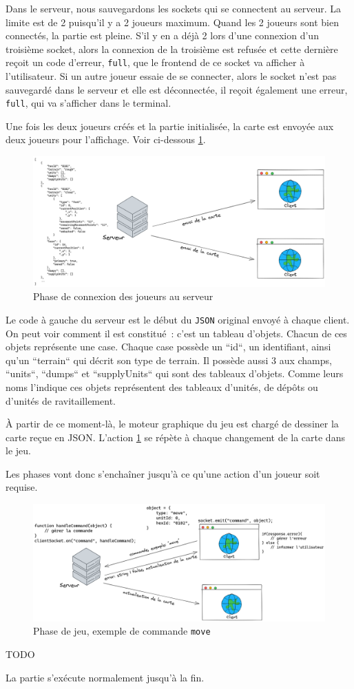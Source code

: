 Dans le serveur, nous sauvegardons les sockets qui se connectent au serveur. La limite est de 2 puisqu'il y a 2 joueurs maximum. Quand les 2 joueurs sont bien connectés, la partie est pleine. S'il y en a déjà 2 lors d'une connexion d'un troisième socket, alors la connexion de la troisième est refusée et cette dernière reçoit un code d'erreur, {\tt full}, que le frontend de ce socket va afficher à l'utilisateur.
Si un autre joueur essaie de se connecter, alors le socket n'est pas sauvegardé dans le serveur et elle est déconnectée, il reçoit également une erreur, {\tt full}, qui va s'afficher dans le terminal.

Une fois les deux joueurs créés et la partie initialisée, la carte est envoyée aux deux joueurs pour l'affichage. Voir ci-dessous \ref{reseau_carte}.

\begin{figure}[H]
    \centering
    \includegraphics[scale=0.25]{data/reseau_map.png}
    \caption{Phase de connexion des joueurs au serveur}
    \label{reseau_carte}
\end{figure}

Le code à gauche du serveur est le début du {\tt JSON} original envoyé à chaque client.
On peut voir comment il est constitué : c'est un tableau d'objets. Chacun de ces objets représente une case.
Chaque case possède un ``id``, un identifiant, ainsi qu'un ``terrain`` qui décrit son type de terrain.
Il possède aussi 3 aux champs, ``units``, ``dumps`` et ``supplyUnits`` qui sont des tableaux d'objets.
Comme leurs noms l'indique ces objets représentent des tableaux d'unités, de dépôts ou d'unités de ravitaillement.

À partir de ce moment-là, le moteur graphique du jeu est chargé de dessiner la carte reçue en JSON.
L'action \ref{reseau_carte} se répète à chaque changement de la carte dans le jeu.


Les phases vont donc s'enchaîner jusqu'à ce qu'une action d'un joueur soit requise.

\begin{figure}[H]
    \centering
    \includegraphics[scale=0.25]{data/reseau_commande.png}
    \caption{Phase de jeu, exemple de commande {\tt move}}
\end{figure}

TODO

La partie s'exécute normalement jusqu'à la fin.